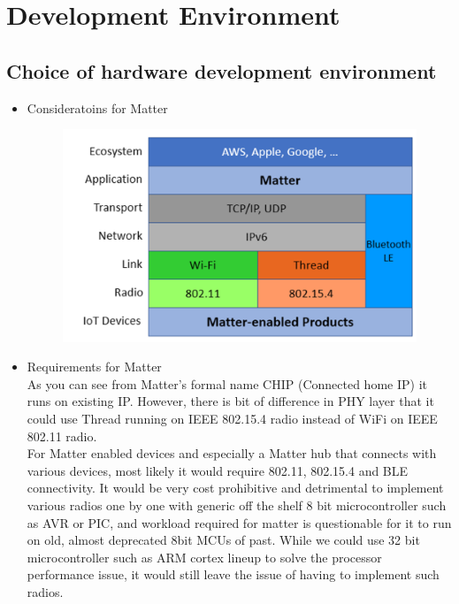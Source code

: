 \documentclass[conference]{IEEEtran}
\begin{document}
\begin{enumerate}[label=\arabic*.]
\begin{enumerate}[label=\alph*.]
\end{enumerate}

\end{enumerate}


\section{\large{Development Environment}}

\subsection{\large{Choice of hardware development environment}}
\begin{itemize}
\item Consideratoins for Matter\\
\begin{figure}[H]\centering \includegraphics[scale=0.25]{images/consideratoins-matter.png}\end{figure}
\item Requirements for Matter\\
As you can see from Matter’s formal name CHIP (Connected home IP) it runs on existing IP. However, there is bit of difference in PHY layer that it could use Thread running on IEEE 802.15.4 radio instead of WiFi on IEEE 802.11 radio.\\
For Matter enabled devices and especially a Matter hub that connects with various devices, most likely it would require 802.11, 802.15.4 and BLE connectivity.  It would be very cost prohibitive and detrimental to implement various radios one by one with generic off the shelf 8 bit microcontroller such as AVR or PIC, and workload required for matter is questionable for it to run on old, almost deprecated 8bit MCUs of past. While we could use 32 bit microcontroller such as ARM cortex lineup to solve the processor performance issue, it would still leave the issue of having to implement such radios.\\

\end{itemize}
\end{document}
